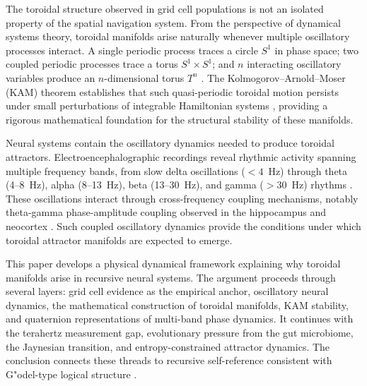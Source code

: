 \documentclass[12pt,a4paper]{article}
\makeatletter
\let\orig@subsection\subsection
\renewcommand{\subsection}{\@ifstar{\orig@subsection*}{\@dblarg{\my@subsection}}}
\def\my@subsection[#1]#2{\orig@subsection[#1]{#2}\noindent\@afterindentfalse\@afterheading}
\makeatother
\begin{document}
\subsection{Why Toroidal Geometry Matters}

The toroidal structure observed in grid cell populations is not an isolated property of the spatial navigation system. From the perspective of dynamical systems theory, toroidal manifolds arise naturally whenever multiple oscillatory processes interact. A single periodic process traces a circle $S^1$ in phase space; two coupled periodic processes trace a torus $S^1 \times S^1$; and $n$ interacting oscillatory variables produce an $n$-dimensional torus $T^n$ \cite{Strogatz2015}. The Kolmogorov--Arnold--Moser (KAM) theorem establishes that such quasi-periodic toroidal motion persists under small perturbations of integrable Hamiltonian systems \cite{Kolmogorov1954, Arnold1963, Moser1962}, providing a rigorous mathematical foundation for the structural stability of these manifolds.

Neural systems contain the oscillatory dynamics needed to produce toroidal attractors. Electroencephalographic recordings reveal rhythmic activity spanning multiple frequency bands, from slow delta oscillations ($<4$~Hz) through theta (4--8~Hz), alpha (8--13~Hz), beta (13--30~Hz), and gamma ($>30$~Hz) rhythms \cite{Buzsaki2006, Buzsaki2004}. These oscillations interact through cross-frequency coupling mechanisms, notably theta-gamma phase-amplitude coupling observed in the hippocampus and neocortex \cite{Canolty2006, Tort2009, Lisman2005}. Such coupled oscillatory dynamics provide the conditions under which toroidal attractor manifolds are expected to emerge.

\subsection{Goal of This Paper}

This paper develops a physical dynamical framework explaining why toroidal manifolds arise in recursive neural systems. The argument proceeds through several layers: grid cell evidence as the empirical anchor, oscillatory neural dynamics, the mathematical construction of toroidal manifolds, KAM stability, and quaternion representations of multi-band phase dynamics. It continues with the terahertz measurement gap, evolutionary pressure from the gut microbiome, the Jaynesian transition, and entropy-constrained attractor dynamics. The conclusion connects these threads to recursive self-reference consistent with G"{o}del-type logical structure \cite{Godel1931, Hofstadter1979}.
\end{document}
